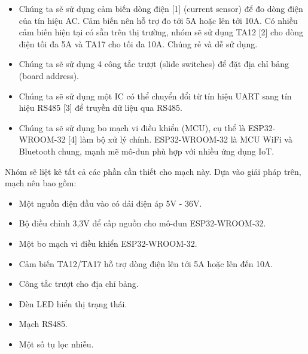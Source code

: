 \begin{itemize}
    \item Chúng ta sẽ sử dụng cảm biến dòng điện [1] (current sensor) để đo dòng điện của tín hiệu AC. Cảm biến
    nên hỗ trợ đo tới 5A hoặc lên tới 10A. Có nhiều cảm biến hiện tại
    có sẵn trên thị trường, nhóm sẽ sử dụng TA12 [2] cho dòng điện tối đa 5A
    và TA17 cho tối đa 10A. Chúng rẻ và dễ sử dụng.
    \item Chúng ta sẽ sử dụng 4 công tắc trượt (slide switches) để đặt địa chỉ bảng (board address).
    \item Chúng ta sẽ sử dụng một IC có thể chuyển đổi từ tín hiệu UART sang tín hiệu RS485 [3] để truyền dữ liệu qua RS485.
    \item Chúng ta sẽ sử dụng bo mạch vi điều khiển (MCU), cụ thể là ESP32-WROOM-32 [4] làm
    bộ xử lý chính. ESP32-WROOM-32 là MCU WiFi và Bluetooth chung, mạnh mẽ
    mô-đun phù hợp với nhiều ứng dụng IoT.
\end{itemize}

Nhóm sẽ liệt kê tất cả các phần cần thiết cho mạch này. Dựa vào giải pháp trên,
mạch nên bao gồm:
\begin{itemize}
    \item Một nguồn điện đầu vào có dải điện áp 5V - 36V.
    \item Bộ điều chỉnh 3,3V để cấp nguồn cho mô-đun ESP32-WROOM-32.
    \item Một bo mạch vi điều khiển ESP32-WROOM-32.
    \item Cảm biến TA12/TA17 hỗ trợ dòng điện lên tới 5A hoặc lên đến 10A.
    \item Công tắc trượt cho địa chỉ bảng.
    \item Đèn LED hiển thị trạng thái.
    \item Mạch RS485.
    \item Một số tụ lọc nhiễu.
\end{itemize}


